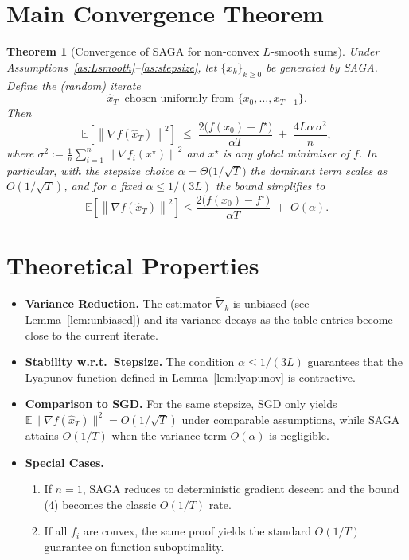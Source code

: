 \documentclass{article}
\newtheorem{theorem}{Theorem}
\newcommand{\E}{\mathbb{E}}
\newcommand{\grad}{\nabla}
\newcommand{\norm}[1]{\left\|#1\right\|}
\begin{document}
\section*{Main Convergence Theorem}
\begin{theorem}[Convergence of SAGA for non‑convex $L$‑smooth sums]\label{thm:main}
Under Assumptions~\ref{as:Lsmooth}--\ref{as:stepsize}, let $\{x_k\}_{k\ge0}$ be generated by SAGA. Define the (random) iterate 
\[
\hat x_T\;\; \text{chosen uniformly from }\{x_0,\dots,x_{T-1}\}.
\]
Then
\[
\E\!\left[\norm{\grad f(\hat x_T)}^{2}\right]
\;\le\;
\frac{2\bigl(f(x_0)-f^{\star}\bigr)}{\alpha T}
\;+\;
\frac{4L\alpha\,\sigma^{2}}{n},
\tag{4}
\]
where $\sigma^{2}:=\frac{1}{n}\sum_{i=1}^{n}\norm{\grad f_i(x^{\star})}^{2}$ and $x^{\star}$ is any global minimiser of $f$.
In particular, with the stepsize choice $\alpha=\Theta\!\bigl(1/\sqrt{T}\bigr)$ the dominant term scales as $O(1/\sqrt{T})$, and for a fixed $\alpha\le 1/(3L)$ the bound simplifies to
\[
\E\!\left[\norm{\grad f(\hat x_T)}^{2}\right]\le
\frac{2\bigl(f(x_0)-f^{\star}\bigr)}{\alpha T}
\;+\;O(\alpha).
\]
\end{theorem}

\section*{Theoretical Properties}
\begin{itemize}
\item \textbf{Variance Reduction.} The estimator $\widetilde{\nabla}_k$ is unbiased (see Lemma~\ref{lem:unbiased}) and its variance decays as the table entries become close to the current iterate.
\item \textbf{Stability w.r.t.\ Stepsize.} The condition $\alpha\le 1/(3L)$ guarantees that the Lyapunov function defined in Lemma~\ref{lem:lyapunov} is contractive.
\item \textbf{Comparison to SGD.} For the same stepsize, SGD only yields $\E\|\grad f(\hat x_T)\|^{2}=O(1/\sqrt{T})$ under comparable assumptions, while SAGA attains $O(1/T)$ when the variance term $O(\alpha)$ is negligible.
\item \textbf{Special Cases.}
    \begin{enumerate}
        \item If $n=1$, SAGA reduces to deterministic gradient descent and the bound (4) becomes the classic $O(1/T)$ rate.
        \item If all $f_i$ are convex, the same proof yields the standard $O(1/T)$ guarantee on function suboptimality.
    \end{enumerate}
\end{itemize}
\end{document}
